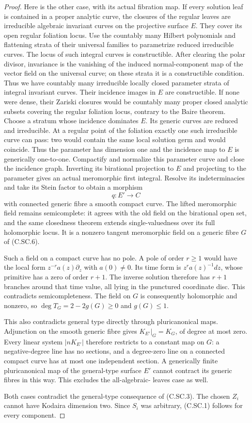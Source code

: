 \begin{proof}
Here is the other case, with its actual
fibration map. If every solution leaf is
contained in a proper analytic curve,
the closures of the regular leaves are
irreducible algebraic invariant curves
on the projective surface $E$. They
cover its open regular foliation locus.
Use the countably many Hilbert polynomials
and flattening strata of their universal
families to parametrize reduced irreducible
curves. The locus of such integral curves
is constructible. After clearing the
polar divisor, invariance is the vanishing
of the induced normal-component map of
the vector field on the universal curve;
on these strata it is a constructible
condition. Thus we have countably many
irreducible locally closed parameter
strata of integral invariant curves.
Their incidence images in $E$ are
constructible. If none were dense, their
Zariski closures would be countably many
proper closed analytic subsets covering
the regular foliation locus, contrary
to the Baire theorem. Choose a stratum
whose incidence dominates $E$. Its
generic curves are reduced and
irreducible. At a regular point of the
foliation exactly one such irreducible
curve can pass: two would contain the
same local solution germ and would
coincide. Thus the parameter has dimension
one and the incidence map to $E$ is
generically one-to-one. Compactify and
normalize this parameter curve and
close the incidence graph. Inverting
its birational projection to $E$ and
projecting to the parameter gives an
actual meromorphic first integral.
Resolve its indeterminacies and take its
Stein factor to obtain a morphism
\[
                         q:E'\longrightarrow C
 \tag{C.SC.6}
\]
with connected generic fibre a smooth
compact curve. The lifted meromorphic
field remains semicomplete: it agrees
with the old field on the birational
open set, and the same closedness theorem
extends single-valuedness over its full
holomorphic locus. It is a nonzero
tangent meromorphic field on a generic
fibre $G$ of (C.SC.6).

Such a field on a compact curve has no
pole. A pole of order $r\ge1$ would
have the local form $z^{-r}a(z)\partial_z$
with $a(0)\ne0$. Its time form is
$z^r a(z)^{-1}dz$, whose primitive has
a zero of order $r+1$. The inverse
solution therefore has $r+1$ branches
around that time value, all lying in
the punctured coordinate disc. This
contradicts semicompleteness. The field
on $G$ is consequently holomorphic
and nonzero, so
$\deg T_G=2-2g(G)\ge0$ and $g(G)\le1$.

This also contradicts general type
directly through pluricanonical maps.
Adjunction on the smooth generic fibre
gives $K_{E'}|_G=K_G$, of degree at
most zero. Every linear system
$|nK_{E'}|$ therefore restricts to a
constant map on $G$: a negative-degree
line has no sections, and a degree-zero
line on a connected compact curve has
at most one independent section. A
generically finite pluricanonical map
of the general-type surface $E'$ cannot
contract its generic fibres in this
way. This excludes the all-algebraic-
leaves case as well.

Both cases contradict the general-type
consequence of (C.SC.3). The chosen
$Z_i$ cannot have Kodaira dimension
two. Since $S_i$ was arbitrary,
(C.SC.1) follows for every component.
\end{proof}
